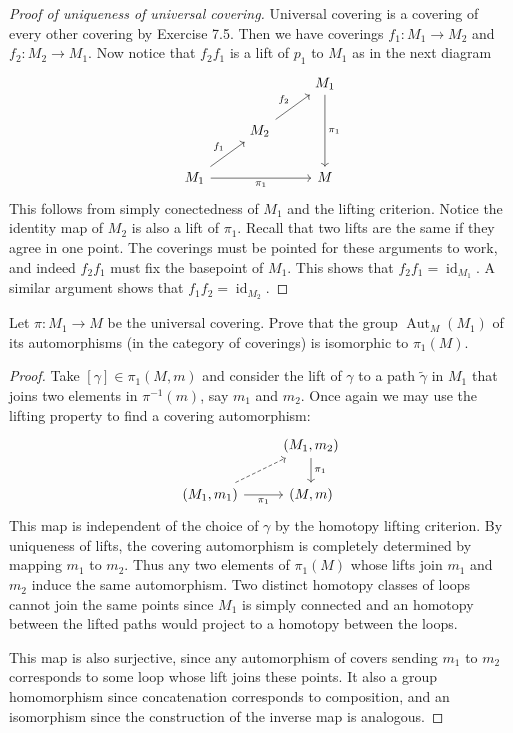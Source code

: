 \documentclass{article}
\DeclareMathOperator{\id}{id}
\DeclareMathOperator{\Aut}{Aut}
\begin{document}
\begin{proof}[Proof of uniqueness of universal covering]
	Universal covering is a covering of every other covering by Exercise 7.5. Then we have coverings $f_1:M_1\to M_2$ and $f_2:M_2\to M_1$. Now notice that $f_2f_1$ is a lift of $p_1$ to $M_1$ as in the next diagram
	\[\begin{tikzcd}
		&&M_1\arrow[dd,"\pi_1"]\\
		&M_2\arrow[ur,"f_2"]\\
		M_1\arrow[ur,"f_1"]\arrow[rr,swap,"\pi_1"]&&M
	\end{tikzcd}\]
	This follows from simply conectedness of $M_1$ and the lifting criterion. Notice the identity map of $M_2$ is also a lift of $\pi_1$. Recall that two lifts are the same if they agree in one point. The coverings must be pointed for these arguments to work, and indeed $f_2f_1$ must fix the basepoint of $M_1$. This shows that $f_2f_1=\id_{M_1}$. A similar argument shows that $f_1f_2=\id_{M_2}$.
\end{proof}
\begin{exercise}
	Let $\pi : M_1\to M$ be the universal covering. Prove that the group $\Aut_M(M_1)$ of its automorphisms (in the category of coverings) is isomorphic to $\pi_1(M)$.
\end{exercise}
\begin{proof}
 	Take $[\gamma]\in\pi_1(M,m)$ and consider the lift of $\gamma$ to a path $\tilde\gamma$ in $M_1$ that joins two elements in $\pi^{-1}(m)$, say $m_1$ and $m_2$. Once again we may use the lifting property to find a covering automorphism:
	\[\begin{tikzcd}
		&(M_1,m_2)\arrow[d,"\pi_1"]\\
		(M_1,m_1)\arrow[ur,dashed]\arrow[r,"\pi_1",swap]&(M,m)
	\end{tikzcd}\]
	This map is independent of the choice of $\gamma$ by the homotopy lifting criterion. By uniqueness of lifts, the covering automorphism is completely determined by mapping $m_1$ to $m_2$. Thus any two elements of $\pi_1(M)$ whose lifts join $m_1$ and $m_2$ induce the same automorphism. Two distinct homotopy classes of loops cannot join the same points since $M_1$ is simply connected and an homotopy between the lifted paths would project to a homotopy between the loops.
	
	This map is also surjective, since any automorphism of covers sending $m_1$ to $m_2$ corresponds to some loop whose lift joins these points. It also a group homomorphism since concatenation corresponds to composition, and an isomorphism since the construction of the inverse map is analogous.
\end{proof}
\end{document}
